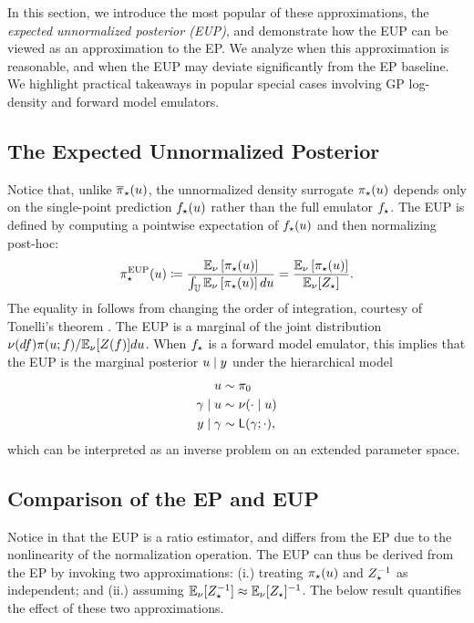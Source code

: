 \documentclass[12pt]{article}
\begin{document}
In this section, we introduce the most popular of these approximations, the 
\textit{expected unnormalized posterior (EUP)}, and demonstrate 
how the EUP can be viewed as an approximation to the EP.
We analyze when this approximation is reasonable, and when the EUP may 
deviate significantly from the EP baseline. We highlight practical takeaways 
in popular special cases involving GP log-density and forward model emulators.

\subsection{The Expected Unnormalized Posterior} \label{sec:eup}
Notice that, unlike ${\overline{\pi}}_{\star}(u)$, the unnormalized density surrogate
${\pi}_{\star}(u)$ depends only on the single-point prediction ${f}_{\star}(u)$
rather than the full emulator ${f}_{\star}$. The EUP is defined by computing
a pointwise expectation of ${f}_{\star}(u)$ and then normalizing post-hoc:
\begin{equation}
{\pi}_{\star}^{\mathrm{EUP}}(u) \coloneqq 
\frac{\mathbb{E}_{\nu} \left[{\pi}_{\star}(u) \right]}{\int_{\mathbb{U}} \mathbb{E}_{\nu}\left[{\pi}_{\star}(u) \right] du}
= \frac{\mathbb{E}_{\nu}\left[{\pi}_{\star}(u) \right]}{\mathbb{E}_{\nu}[{Z}_{\star}]}. \label{eq:post-approx-EL} 
\end{equation}
The equality in  follows from
changing the order of integration, courtesy of Tonelli's theorem \citep{StuartTeck1}. The EUP
is a marginal of the joint distribution 
$\nu(df) \pi(u; f) / \mathbb{E}_{\nu}[Z(f)] du$. 
When ${f}_{\star}$ is a forward model emulator, this implies that the EUP is the 
marginal posterior $u \mid y$ under the hierarchical model 
\begin{align}
u &\sim \pi_0 \label{eq:el-prob-model} \\
\gamma \mid u &\sim \nu(\cdot \mid u) \nonumber \\
y \mid \gamma &\sim \mathsf{L}(\gamma; \cdot), \nonumber
\end{align}
which can be interpreted as an inverse problem on an extended parameter space.

\subsection{Comparison of the EP and EUP}
Notice in  that the EUP is a ratio estimator, and differs from 
the EP due to the nonlinearity of the normalization operation. The EUP can thus 
be derived from the EP by invoking two approximations: 
(i.) treating ${\pi}_{\star}(u)$ and ${Z}_{\star}^{-1}$ as independent; and 
(ii.) assuming $\mathbb{E}_{\nu}[{Z}_{\star}^{-1}] \approx \mathbb{E}_{\nu}[{Z}_{\star}]^{-1}$.
The below result quantifies the effect of these two approximations.
\end{document}
